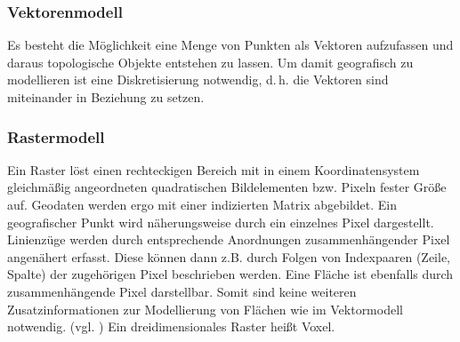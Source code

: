 \subsubsection{Vektorenmodell}

Es besteht die Möglichkeit eine Menge von Punkten als Vektoren aufzufassen und daraus topologische Objekte entstehen zu lassen.
Um damit geografisch zu modellieren ist eine Diskretisierung notwendig, d.\,h. die Vektoren sind miteinander in Beziehung zu setzen.

\subsubsection{Rastermodell}
Ein Raster löst einen rechteckigen Bereich mit in einem Koordinatensystem gleichmäßig angeordneten quadratischen Bildelementen bzw. Pixeln fester Größe auf.
Geodaten werden ergo mit einer indizierten Matrix abgebildet.
Ein geografischer Punkt wird näherungsweise durch ein einzelnes Pixel dargestellt.
Linienzüge werden durch entsprechende Anordnungen zusammenhängender Pixel angenähert erfasst.
Diese können dann z.B. durch Folgen von Indexpaaren (Zeile, Spalte) der zugehörigen Pixel beschrieben werden.
Eine Fläche ist ebenfalls durch zusammenhängende Pixel darstellbar.
Somit sind keine weiteren Zusatzinformationen zur Modellierung von Flächen wie im Vektormodell notwendig. (vgl. \cite[S.136]{book:gi-theopluspraxis3})
Ein dreidimensionales Raster heißt Voxel.

